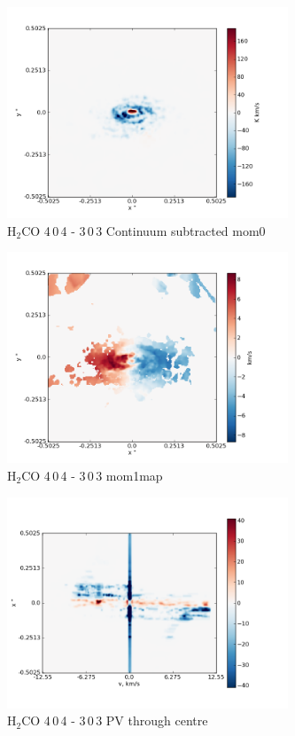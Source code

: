 \documentclass[useAMS,usenatbib]{mn2e}
\begin{document}
\begin{figure}
 \includegraphics[width=84mm]{Figures/sim/imageH2CO_4-0-4->3-0-3_30deg_contSub.png}

 \caption{H$_2$CO 4$\,$0$\,$4 - 3$\,$0$\,$3 Continuum subtracted mom0}
\end{figure}

\begin{figure}
 \includegraphics[width=84mm]{Figures/sim/imageH2CO_4-0-4->3-0-3_30deg_mom1.png}

 \caption{H$_2$CO 4$\,$0$\,$4 - 3$\,$0$\,$3 mom1map}
\end{figure}

\begin{figure}
 \includegraphics[width=84mm]{Figures/sim/imageH2CO_4-0-4->3-0-3_30deg_PV_centre.png}

 \caption{H$_2$CO 4$\,$0$\,$4 - 3$\,$0$\,$3 PV through centre}
\end{figure}
\end{document}
